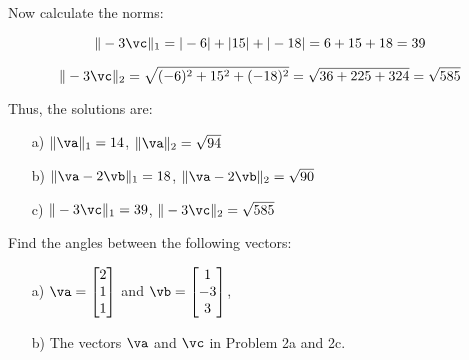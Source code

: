\begin{sol}
\begin{enumerate}
        Now calculate the norms:
        
        \[
        \|-3\vc\|_1 = |-6| + |15| + |-18| = 6 + 15 + 18 = 39
        \]
        
        \[
        \|-3\vc\|_2 = \sqrt{(-6)^2 + 15^2 + (-18)^2} = \sqrt{36 + 225 + 324} = \sqrt{585}
        \]
    \end{enumerate}

    Thus, the solutions are:
    
    \begin{enumerate}
        \item[a)] $\|\va\|_1 = 14$, \quad $\|\va\|_2 = \sqrt{94}$
        \item[b)] $\|\va - 2\vb\|_1 = 18$, \quad $\|\va - 2\vb\|_2 = \sqrt{90}$
        \item[c)] $\|-3\vc\|_1 = 39$, \quad $\|-3\vc\|_2 = \sqrt{585}$
    \end{enumerate}
\end{sol}

\newpage

\begin{problem}[1 point]
    Find the angles between the following vectors:

    \begin{enumerate}
        \item[a) ] $\va= \begin{bmatrix} 2\\1\\1\end{bmatrix}$ and $\vb= \begin{bmatrix} 1\\-3\\3\end{bmatrix}$,
        
        \item[b) ] The vectors $\va$ and $\vc$ in Problem 2a and 2c.

    \end{enumerate}
\end{problem}
\bigskip

